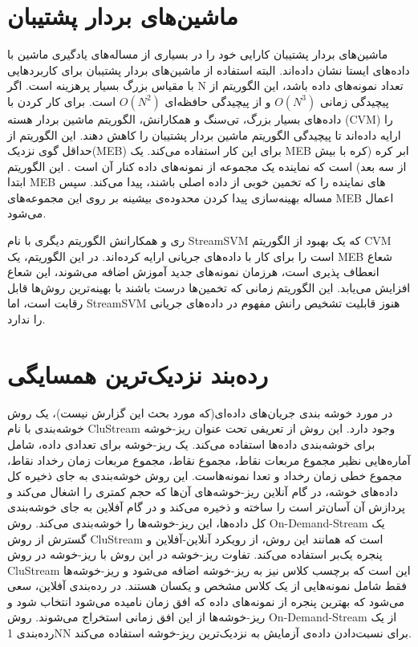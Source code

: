 \section{ماشین‌های بردار پشتیبان}
ماشین‌های بردار پشتیبان
کارایی خود را در بسیاری از مساله‌های یادگیری ماشین با داده‌های ایستا نشان داده‌‌اند\cite{Nguyen2015}. البته استفاده از ماشین‌های بردار پشتیبان برای کاربردهایی با مقیاس بزرگ بسیار پرهزینه است. اگر N تعداد نمونه‌های داده باشد، این الگوریتم از پیچیدگی زمانی $ O(N^3) $ و از پیچیدگی حافظه‌ای $ O(N^2) $ است. برای کار کردن با داده‌های بسیار بزرگ، تی‌سنگ
و همکارانش، الگوریتم ماشین بردار هسته
(CVM)
 را ارایه داده‌اند تا پیچیدگی الگوریتم ماشین بردار پشتیبان را کاهش دهند. این الگوریتم از حداقل گوی نزدیک(MEB) برای این کار استفاده می‌کند. یک MEB ابر کره
(کره با بیش از سه بعد) است که نماینده یک مجموعه از نمونه‌های داده کنار آن است\cite{tsang2007simpler} . این الگوریتم ابتدا MEB های نماینده را که تخمین خوبی از داده اصلی باشند، پیدا می‌کند. سپس مساله بهینه‌سازی پیدا کردن محدوده‌ی بیشینه بر روی این مجموعه‌های MEB اعمال می‌شود.


ری
و همکارانش  \cite{rai2009streamed} الگوریتم دیگری با نام StreamSVM که یک بهبود از الگوریتم CVM است را برای کار با داده‌های جریانی ارایه کرده‌اند. در این الگوریتم، یک MEB شعاع انعطاف پذیری است، هرزمان نمونه‌های جدید آموزش اضافه می‌شوند، این شعاع افزایش می‌یابد. این الگوریتم زمانی که تخمین‌ها درست باشند با بهینه‌ترین روش‌ها قابل رقابت است، اما StreamSVM هنوز قابلیت تشخیص رانش‌ مفهوم در داده‌های جریانی را ندارد.


\section{رده‌بند نزدیک‌ترین همسایگی}

در مورد خوشه بندی جریان‌های داده‌ای(که مورد بحث این گزارش نیست)، یک روش خوشه‌بندی با نام CluStream وجود دارد. این روش از تعریفی تحت عنوان ریز-خوشه
برای خوشه‌بندی داده‌ها استفاده می‌کند. یک ریز-خوشه برای تعدادی داده، شامل آماره‌هایی نظیر مجموع مربعات نقاط، مجموع نقاط، مجموع مربعات زمان رخداد نقاط، مجموع خطی زمان رخداد و تعدا نمونه‌هاست. این روش خوشه‌بندی به جای ذخیره کل داده‌های خوشه، در گام آنلاین ریز-خوشه‌های آن‌ها که حجم کمتری را اشغال می‌کند و پردازش آن آسان‌تر است را ساخته و ذخیره می‌کند و در گام آفلاین به جای خوشه‌بندی کل داده‌ها، این ریز-خوشه‌ها را خوشه‌بندی می‌کند\cite{Nguyen2015}.
روش On-Demand-Stream \cite{aggarwal2003framework} یک گسترش از روش CluStream است که همانند این روش، از رویکرد آنلاین-آفلاین و پنجره یک‌بر استفاده می‌کند. تفاوت ریز-خوشه در این روش با ریز-خوشه در روش CluStream این است که برچسب کلاس نیز به ریز-خوشه اضافه می‌شود و ریز-خوشه‌ها فقط شامل نمونه‌هایی از یک کلاس مشخص و یکسان هستند. در رده‌بندی آفلاین، سعی می‌شود که بهترین پنجره از نمونه‌های داده که افق زمان
نامیده می‌شود انتخاب شود و ریز-خوشه‌ها از این افق زمانی استخراج می‌شوند. روش On-Demand-Stream از یک رده‌بندی 1NN برای نسبت‌دادن داده‌ی آزمایش به نزدیک‌ترین ریز-خوشه استفاده‌ می‌کند.

